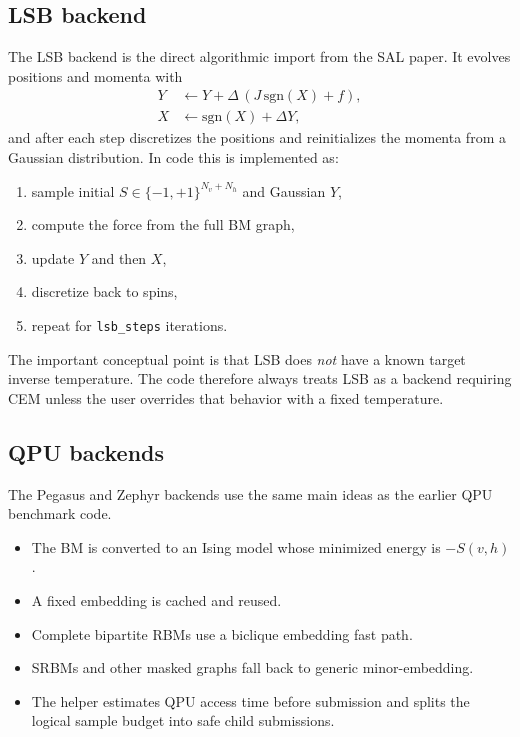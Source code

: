 \documentclass[11pt]{article}
\begin{document}
\subsection{LSB backend}

The LSB backend is the direct algorithmic import from the SAL paper. It evolves
positions and momenta with
\begin{align}
Y &\leftarrow Y + \Delta\,(J\,\mathrm{sgn}(X)+f),\\
X &\leftarrow \mathrm{sgn}(X) + \Delta Y,
\end{align}
and after each step discretizes the positions and reinitializes the momenta from
a Gaussian distribution. In code this is implemented as:
\begin{enumerate}
  \item sample initial $S\in\{-1,+1\}^{N_v+N_h}$ and Gaussian $Y$,
  \item compute the force from the full BM graph,
  \item update $Y$ and then $X$,
  \item discretize back to spins,
  \item repeat for \texttt{lsb\_steps} iterations.
\end{enumerate}

The important conceptual point is that LSB does \emph{not} have a known target
inverse temperature. The code therefore always treats LSB as a backend requiring
CEM unless the user overrides that behavior with a fixed temperature.

\subsection{QPU backends}

The Pegasus and Zephyr backends use the same main ideas as the earlier QPU
benchmark code.

\begin{itemize}
  \item The BM is converted to an Ising model whose minimized energy is
  $-S(v,h)$.
  \item A fixed embedding is cached and reused.
  \item Complete bipartite RBMs use a biclique embedding fast path.
  \item SRBMs and other masked graphs fall back to generic minor-embedding.
  \item The helper estimates QPU access time before submission and splits the
  logical sample budget into safe child submissions.
\end{itemize}
\end{document}
